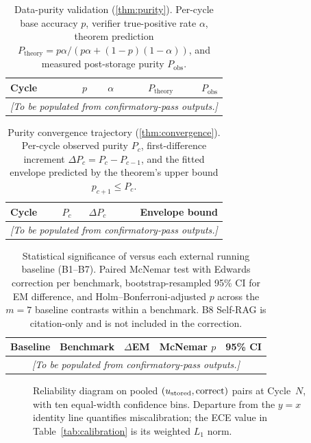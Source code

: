 \begin{table}[t]
\centering
\caption{Data-purity validation (\cref{thm:purity}). Per-cycle
base accuracy $p$, verifier true-positive rate $\alpha$, theorem
prediction $P_{\text{theory}} = p\alpha / (p\alpha + (1-p)(1-\alpha))$,
and measured post-storage purity $P_{\text{obs}}$.}
\label{tab:purity}
\begin{tabular}{lrrrr}
\toprule
Cycle & $p$ & $\alpha$ & $P_{\text{theory}}$ & $P_{\text{obs}}$ \\
\midrule
\multicolumn{5}{c}{\emph{[To be populated from confirmatory-pass outputs.]}}\\
\bottomrule
\end{tabular}
\end{table}

\begin{table}[t]
\centering
\caption{Purity convergence trajectory (\cref{thm:convergence}).
Per-cycle observed purity $P_c$, first-difference increment
$\Delta P_c = P_c - P_{c-1}$, and the fitted envelope predicted by
the theorem's upper bound $p_{c+1} \le P_c$.}
\label{tab:purity-convergence}
\begin{tabular}{lrrr}
\toprule
Cycle & $P_c$ & $\Delta P_c$ & Envelope bound \\
\midrule
\multicolumn{4}{c}{\emph{[To be populated from confirmatory-pass outputs.]}}\\
\bottomrule
\end{tabular}
\end{table}

\begin{table}[t]
\centering
\caption{Statistical significance of \caem{} versus each external
running baseline (B1--B7). Paired McNemar test with Edwards correction
per benchmark, bootstrap-resampled 95\% CI for EM difference, and
Holm--Bonferroni-adjusted $p$ across the $m=7$ baseline contrasts
within a benchmark. B8 Self-RAG is citation-only and is not
included in the correction.}
\label{tab:sig-test}
\begin{tabular}{llrrr}
\toprule
Baseline & Benchmark & $\Delta$EM & McNemar $p$ & 95\% CI \\
\midrule
\multicolumn{5}{c}{\emph{[To be populated from confirmatory-pass outputs.]}}\\
\bottomrule
\end{tabular}
\end{table}

\begin{figure}[t]
\centering
{}
\caption{Reliability diagram on pooled $(u_{\text{stored}}, \mathrm{correct})$
pairs at Cycle~$N$, with ten equal-width confidence bins. Departure
from the $y=x$ identity line quantifies miscalibration; the ECE
value in Table~\ref{tab:calibration} is its weighted $L_1$ norm.}
\label{fig:reliability}
\end{figure}

